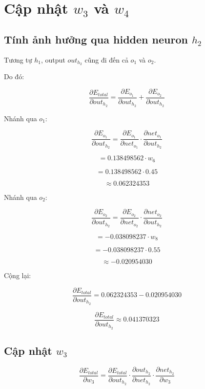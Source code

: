 \documentclass[12pt,a4paper]{report}
\begin{document}
\chapter{Cập nhật $w_3$ và $w_4$}

\section{Tính ảnh hưởng qua hidden neuron $h_2$}

Tương tự $h_1$, output $out_{h_2}$ cũng đi đến cả $o_1$ và $o_2$.

Do đó:

\[
    \frac{\partial E_{total}}{\partial out_{h_2}}
    =
    \frac{\partial E_{o_1}}{\partial out_{h_2}}
    +
    \frac{\partial E_{o_2}}{\partial out_{h_2}}
\]

Nhánh qua $o_1$:

\[
    \frac{\partial E_{o_1}}{\partial out_{h_2}}
    =
    \frac{\partial E_{o_1}}{\partial net_{o_1}}
    \cdot
    \frac{\partial net_{o_1}}{\partial out_{h_2}}
\]

\[
    =
    0.138498562\cdot w_6
\]

\[
    =
    0.138498562\cdot 0.45
\]

\[
    \approx 0.062324353
\]

Nhánh qua $o_2$:

\[
    \frac{\partial E_{o_2}}{\partial out_{h_2}}
    =
    \frac{\partial E_{o_2}}{\partial net_{o_2}}
    \cdot
    \frac{\partial net_{o_2}}{\partial out_{h_2}}
\]

\[
    =
    -0.038098237\cdot w_8
\]

\[
    =
    -0.038098237\cdot 0.55
\]

\[
    \approx -0.020954030
\]

Cộng lại:

\[
    \frac{\partial E_{total}}{\partial out_{h_2}}
    =
    0.062324353
    -
    0.020954030
\]

\[
    \frac{\partial E_{total}}{\partial out_{h_2}}
    \approx 0.041370323
\]

\section{Cập nhật $w_3$}

\[
    \frac{\partial E_{total}}{\partial w_3}
    =
    \frac{\partial E_{total}}{\partial out_{h_2}}
    \cdot
    \frac{\partial out_{h_2}}{\partial net_{h_2}}
    \cdot
    \frac{\partial net_{h_2}}{\partial w_3}
\]
\end{document}
